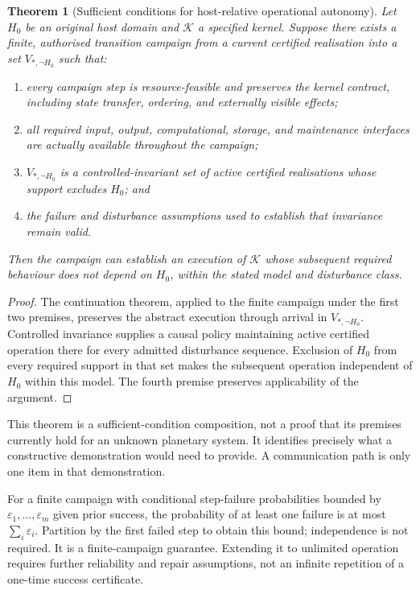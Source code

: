\documentclass[11pt,a4paper]{article}
\newtheorem{theorem}{Theorem}[section]
\theoremstyle{definition}
\theoremstyle{remark}
\newcommand{\calK}{\mathcal{K}}
\begin{document}
\begin{theorem}[Sufficient conditions for host-relative operational autonomy]\label{thm:autonomy}
Let $H_0$ be an original host domain and $\calK$ a specified kernel. Suppose there exists a finite, authorised transition campaign from a current certified realisation into a set $V_{*,\neg H_0}$ such that:
\begin{enumerate}
 \item every campaign step is resource-feasible and preserves the kernel contract, including state transfer, ordering, and externally visible effects;
 \item all required input, output, computational, storage, and maintenance interfaces are actually available throughout the campaign;
 \item $V_{*,\neg H_0}$ is a controlled-invariant set of active certified realisations whose support excludes $H_0$; and
 \item the failure and disturbance assumptions used to establish that invariance remain valid.
\end{enumerate}
Then the campaign can establish an execution of $\calK$ whose subsequent required behaviour does not depend on $H_0$, within the stated model and disturbance class.
\end{theorem}
\begin{proof}
The continuation theorem, applied to the finite campaign under the first two premises, preserves the abstract execution through arrival in $V_{*,\neg H_0}$. Controlled invariance supplies a causal policy maintaining active certified operation there for every admitted disturbance sequence. Exclusion of $H_0$ from every required support in that set makes the subsequent operation independent of $H_0$ within this model. The fourth premise preserves applicability of the argument.
\end{proof}
This theorem is a sufficient-condition composition, not a proof that its premises currently hold for an unknown planetary system. It identifies precisely what a constructive demonstration would need to provide. A communication path is only one item in that demonstration.

For a finite campaign with conditional step-failure probabilities bounded by $\varepsilon_1,\ldots,\varepsilon_m$ given prior success, the probability of at least one failure is at most $\sum_i\varepsilon_i$. Partition by the first failed step to obtain this bound; independence is not required. It is a finite-campaign guarantee. Extending it to unlimited operation requires further reliability and repair assumptions, not an infinite repetition of a one-time success certificate.
\end{document}
